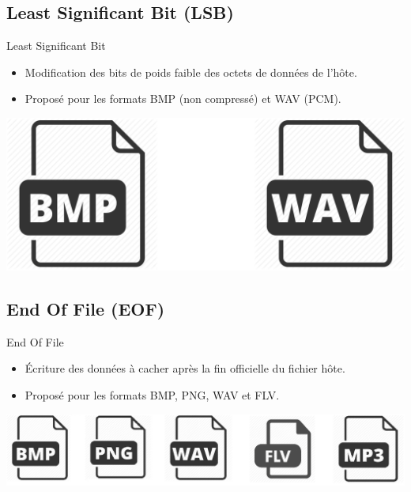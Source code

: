 \documentclass{beamer}
\begin{document}
	\subsection{Least Significant Bit (LSB)}
	\begin{frame}
  
	\begin{block}{Least Significant Bit}
	\begin{itemize}
	[circle]
	\item Modification des bits de poids faible des octets de données de 
	l'hôte. 
	\item Proposé pour les formats BMP (non compressé) et WAV (PCM). 
	\end{itemize}
	\end{block}
	
	\hspace{3.5cm}
    \includegraphics[scale=0.1]{pictures/lsb.png}
	\end{frame}
  
    \subsection{End Of File (EOF)}
    \begin{frame}
    
	\begin{block}{End Of File}
	\begin{itemize}
	[circle]
	\item Écriture des données à cacher après la fin officielle du fichier 
	hôte. 
	\item Proposé pour les formats BMP, PNG, WAV et FLV. 
	\end{itemize}
	\end{block}
	
	\hspace{1cm}
    \includegraphics[scale=0.2]{pictures/eof.png}
    
    \end{frame}
    
\end{document}
